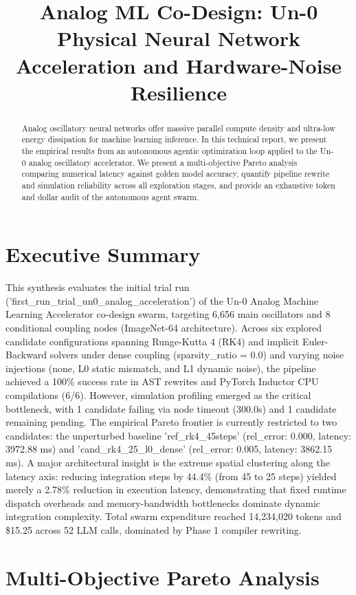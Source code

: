 \documentclass[10pt,conference]{IEEEtran}
\title{Analog ML Co-Design: Un-0 Physical Neural Network Acceleration and Hardware-Noise Resilience}
\author{
    \IEEEauthorblockN{Analog ML Co-Design Agentic Swarm}
    \IEEEauthorblockA{Autonomous AI Hardware Acceleration Framework\\
    Chia Multi-Agent Swarm for Physical Neuromorphic Architectures}
}
\begin{document}
\maketitle

\begin{abstract}
Analog oscillatory neural networks offer massive parallel compute density and ultra-low energy dissipation for machine learning inference. In this technical report, we present the empirical results from an autonomous agentic optimization loop applied to the Un-0 analog oscillatory accelerator. We present a multi-objective Pareto analysis comparing numerical latency against golden model accuracy, quantify pipeline rewrite and simulation reliability across all exploration stages, and provide an exhaustive token and dollar audit of the autonomous agent swarm.
\end{abstract}

\section{Executive Summary}
This synthesis evaluates the initial trial run ('first\_run\_trial\_un0\_analog\_acceleration') of the Un-0 Analog Machine Learning Accelerator co-design swarm, targeting 6,656 main oscillators and 8 conditional coupling nodes (ImageNet-64 architecture). Across six explored candidate configurations spanning Runge-Kutta 4 (RK4) and implicit Euler-Backward solvers under dense coupling (sparsity\_ratio = 0.0) and varying noise injections (none, L0 static mismatch, and L1 dynamic noise), the pipeline achieved a 100\% success rate in AST rewrites and PyTorch Inductor CPU compilations (6/6). However, simulation profiling emerged as the critical bottleneck, with 1 candidate failing via node timeout (300.0s) and 1 candidate remaining pending. The empirical Pareto frontier is currently restricted to two candidates: the unperturbed baseline 'ref\_rk4\_45steps' (rel\_error: 0.000, latency: 3972.88 ms) and 'cand\_rk4\_25\_l0\_dense' (rel\_error: 0.005, latency: 3862.15 ms). A major architectural insight is the extreme spatial clustering along the latency axis: reducing integration steps by 44.4\% (from 45 to 25 steps) yielded merely a 2.78\% reduction in execution latency, demonstrating that fixed runtime dispatch overheads and memory-bandwidth bottlenecks dominate dynamic integration complexity. Total swarm expenditure reached 14,234,020 tokens and \$15.25 across 52 LLM calls, dominated by Phase 1 compiler rewriting.

\section{Multi-Objective Pareto Analysis}
\end{document}
